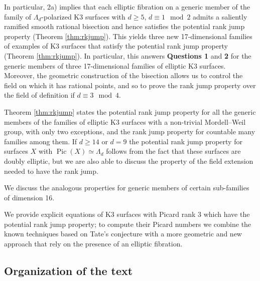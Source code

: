 \documentclass{amsart}
\theoremstyle{definition}
\numberwithin{equation}{section}
\DeclareMathOperator{\Pic}{Pic}
\begin{document}
In particular, 2a) implies that each elliptic fibration on a generic member of the family of $\Lambda_d$-polarized K3 surfaces with $d\geq 5$, $d\equiv 1\mod 2$ admits a saliently ramified smooth rational bisection and hence satisfies the potential rank jump property (Theorem \ref{thm:rkjump}). This yields three new 17-dimensional families of examples of K3 surfaces that satisfy the potential rank jump property (Theorem \ref{thm:rkjump}). In particular, this answers \textbf{Questions 1} and \textbf{2} for the generic members of three 17-dimensional families of elliptic K3 surfaces. Moreover, the geometric construction of the bisection allows us to control the field on which it has rational points, and so to prove the rank jump property over the field of definition if $d\equiv 3\mod 4$. 


    
Theorem \ref{thm:rkjump} states the potential rank jump property for all the generic members of the families of elliptic K3 surfaces with a non-trivial Mordell--Weil group, with only two exceptions, and the rank jump property for countable many families among them.
If $d\geq 14$ or $d=9$ the potential rank jump property for surfaces $X$ with $\Pic(X)\simeq \Lambda_d$ follows from the fact that these surfaces are doubly elliptic, but we are also able to discuss the property of the field extension needed to have the rank jump. 


We discuss the analogous properties for generic members of certain sub-families of dimension 16.

We provide explicit equations of K3 surfaces with Picard rank 3 which have the potential rank jump property; to compute their Picard numbers we combine the known techniques based on Tate's conjecture with a more geometric and new approach that rely on the presence of an elliptic fibration. 
\subsection*{Organization of the text}
\end{document}
